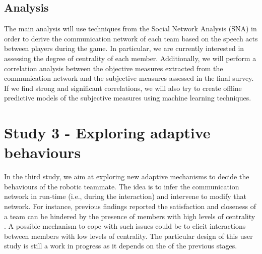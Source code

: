 \subsection{Analysis}
The main analysis will use techniques from the Social Network Analysis (SNA) in order to derive the communication network of each team based on the speech acts between players during the game. In particular, we are currently interested in assessing the degree of centrality of each member. Additionally, we will perform a correlation analysis between the objective measures extracted from the communication network and the subjective measures assessed in the final survey. If we find strong and significant correlations, we will also try to create offline predictive models of the subjective measures using machine learning techniques.


\section{Study 3 - Exploring adaptive behaviours}
\label{sec:fw-study3}
In the third study, we aim at exploring new adaptive mechanisms to decide the behaviours of the robotic teammate. The idea is to infer the communication network in run-time (i.e., during the interaction) and intervene to modify that network. For instance, previous findings reported the satisfaction and closeness of a team can be hindered by the presence of members with high levels of centrality \cite{shaw1964communication}. A possible mechanism to cope with such issues could be to elicit interactions between members with low levels of centrality. The particular design of this user study is still a work in progress as it depends on the of the previous stages.


